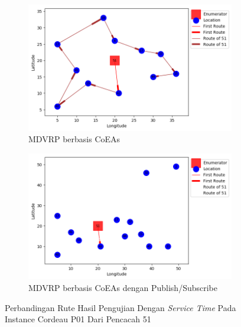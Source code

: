 \begin{figure}[H]
	\centering
	\begin{subfigure}[t]{\textwidth}
		\centering
		\includegraphics[width=\textwidth]{Resources/Images/cordeau_p01_tw/cordeau_p01_tw_51_coes}
		\caption{MDVRP berbasis CoEAs}
		\label{fig:cordeau_p01_tw_51_coes}
	\end{subfigure}
	\begin{subfigure}[t]{\textwidth}
		\centering
		\includegraphics[width=\textwidth]{Resources/Images/cordeau_p01_tw/cordeau_p01_tw_51_pubsub_coes}
		\caption{MDVRP berbasis CoEAs dengan Publish/Subscribe}
		\label{fig:cordeau_p01_tw_51_pubsub_coes}
	\end{subfigure}
	\caption{Perbandingan Rute Hasil Pengujian Dengan \textit{Service Time} Pada Instance Cordeau P01 Dari Pencacah 51}
	\label{fig:cordeau_p01_tw_51}
\end{figure}


